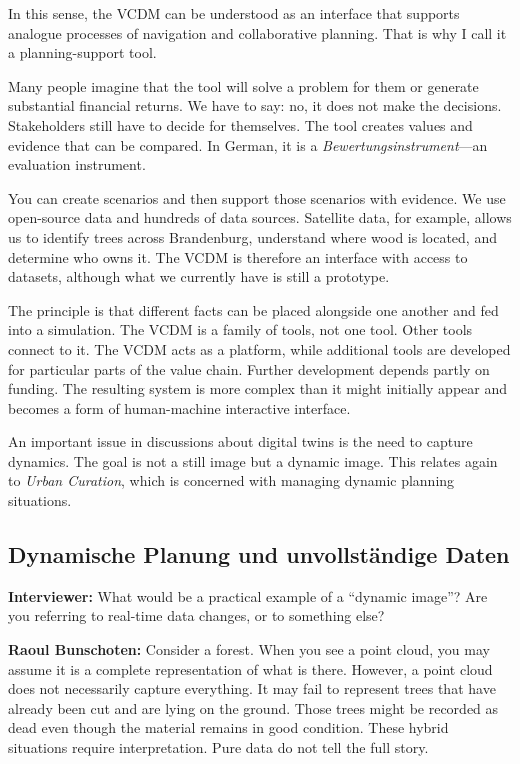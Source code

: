 In this sense, the VCDM can be understood as an interface that supports analogue processes of navigation and collaborative planning. That is why I call it a planning-support tool.

Many people imagine that the tool will solve a problem for them or generate substantial financial returns. We have to say: no, it does not make the decisions. Stakeholders still have to decide for themselves. The tool creates values and evidence that can be compared. In German, it is a \textit{Bewertungsinstrument}—an evaluation instrument.

You can create scenarios and then support those scenarios with evidence. We use open-source data and hundreds of data sources. Satellite data, for example, allows us to identify trees across Brandenburg, understand where wood is located, and determine who owns it. The VCDM is therefore an interface with access to datasets, although what we currently have is still a prototype.

The principle is that different facts can be placed alongside one another and fed into a simulation. The VCDM is a family of tools, not one tool. Other tools connect to it. The VCDM acts as a platform, while additional tools are developed for particular parts of the value chain. Further development depends partly on funding. The resulting system is more complex than it might initially appear and becomes a form of human-machine interactive interface.

An important issue in discussions about digital twins is the need to capture dynamics. The goal is not a still image but a dynamic image. This relates again to \textit{Urban Curation}, which is concerned with managing dynamic planning situations.

\subsection{Dynamische Planung und unvollständige Daten}

\textbf{Interviewer:} What would be a practical example of a “dynamic image”? Are you referring to real-time data changes, or to something else?

\textbf{Raoul Bunschoten:} Consider a forest. When you see a point cloud, you may assume it is a complete representation of what is there. However, a point cloud does not necessarily capture everything. It may fail to represent trees that have already been cut and are lying on the ground. Those trees might be recorded as dead even though the material remains in good condition. These hybrid situations require interpretation. Pure data do not tell the full story.

